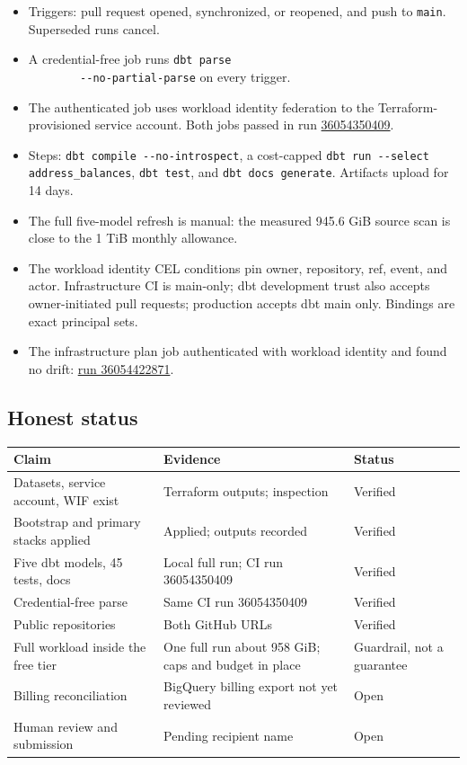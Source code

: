 \documentclass[10pt,a4paper]{article}
\newcommand{\code}[1]{\nolinkurl{#1}}
\begin{document}
\begin{itemize}
  \item Triggers: pull request opened, synchronized, or reopened, and
        push to \code{main}. Superseded runs cancel.
  \item A credential-free job runs \code{dbt parse
        --no-partial-parse} on every trigger.
  \item The authenticated job uses workload identity federation to the
        Terraform-provisioned service account. Both jobs passed in run
        \href{https://github.com/Xocket/astrafy-bch-dbt/actions/runs/36054350409}{36054350409}.
  \item Steps: \code{dbt compile --no-introspect}, a cost-capped
        \code{dbt run --select address_balances}, \code{dbt test}, and
        \code{dbt docs generate}. Artifacts upload for 14 days.
  \item The full five-model refresh is manual: the measured 945.6 GiB
        source scan is close to the 1 TiB monthly allowance.
  \item The workload identity CEL conditions pin owner, repository,
        ref, event, and actor. Infrastructure CI is main-only; dbt
        development trust also accepts owner-initiated pull requests;
        production accepts dbt main only. Bindings are exact principal
        sets.
  \item The infrastructure plan job authenticated with workload
        identity and found no drift:
        \href{https://github.com/Xocket/astrafy-bch-infra/actions/runs/36054422871}{run
        36054422871}.
\end{itemize}

\subsection{Honest status}

{\small
\begin{tabularx}{\textwidth}{L{44mm}L{62mm}L{22mm}}
\toprule
\textbf{Claim} & \textbf{Evidence} & \textbf{Status} \\
\midrule
Datasets, service account, WIF exist & Terraform outputs; inspection & Verified \\
Bootstrap and primary stacks applied & Applied; outputs recorded & Verified \\
Five dbt models, 45 tests, docs & Local full run; CI run 36054350409 & Verified \\
Credential-free parse & Same CI run 36054350409 & Verified \\
Public repositories & Both GitHub URLs & Verified \\
Full workload inside the free tier & One full run about 958 GiB; caps and budget in place & Guardrail, not a guarantee \\
Billing reconciliation & BigQuery billing export not yet reviewed & Open \\
Human review and submission & Pending recipient name & Open \\
\bottomrule
\end{tabularx}
}
\end{document}
